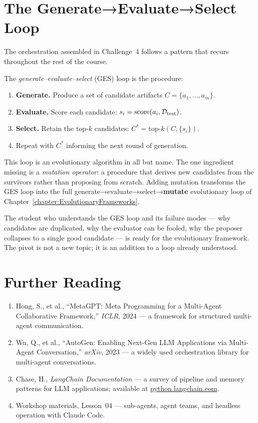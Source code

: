 \section{The Generate→Evaluate→Select Loop}
\label{section:GenEvalSel}

The orchestration assembled in Challenge~4 follows a pattern that recurs throughout the rest of the course.

\begin{definition}
\label{definition:GenEvalSel}
The \emph{generate–evaluate–select} (GES) loop is the procedure:
\begin{enumerate}
\item \textbf{Generate.} Produce a set of candidate artifacts $C = \{a_1, \ldots, a_m\}$.
\item \textbf{Evaluate.} Score each candidate: $s_i = \mathrm{score}(a_i, \mathcal{D}_{\mathrm{test}})$.
\item \textbf{Select.} Retain the top-$k$ candidates: $C^* = \mathrm{top\text{-}}k(C, \{s_i\})$.
\item Repeat with $C^*$ informing the next round of generation.
\end{enumerate}
\end{definition}

This loop is an evolutionary algorithm in all but name.
The one ingredient missing is a \emph{mutation operator}: a procedure that derives new candidates from the survivors rather than proposing from scratch.
Adding mutation transforms the GES loop into the full generate→evaluate→select→\textbf{mutate} evolutionary loop of Chapter~\ref{chapter:EvolutionaryFrameworks}.

The student who understands the GES loop and its failure modes — why candidates are duplicated, why the evaluator can be fooled, why the proposer collapses to a single good candidate — is ready for the evolutionary framework.
The pivot is not a new topic; it is an addition to a loop already understood.

\section*{Further Reading}

\begin{small}
\begin{enumerate}
\item Hong, S., et al., ``MetaGPT: Meta Programming for a Multi-Agent Collaborative Framework,'' \emph{ICLR}, 2024 — a framework for structured multi-agent communication.
\item Wu, Q., et al., ``AutoGen: Enabling Next-Gen LLM Applications via Multi-Agent Conversation,'' \emph{arXiv}, 2023 — a widely used orchestration library for multi-agent conversations.
\item Chase, H., \emph{LangChain Documentation} — a survey of pipeline and memory patterns for LLM applications; available at \href{https://python.langchain.com}{python.langchain.com}.
\item Workshop materials,  Lesson~04 — sub-agents, agent teams, and headless operation with Claude Code.
\end{enumerate}
\end{small}
